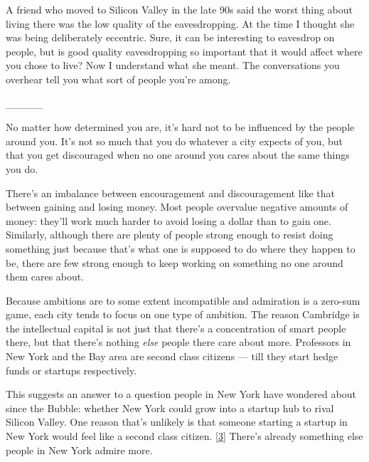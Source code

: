 A friend who
                  moved to Silicon Valley in the late 90s said the worst thing
                  about living there was the low quality of the eavesdropping.
                  At the time I thought she was being deliberately eccentric.
                  Sure, it can be interesting to eavesdrop on people, but is
                  good quality eavesdropping so important that it would affect
                  where you chose to live? Now I understand what she meant. The
                  conversations you overhear tell you what sort of people you're
                  among.


                  \_\_\_\_\_
                  

No matter how determined you are, it's hard not to
                  be influenced by the people around you. It's not so much that
                  you do whatever a city expects of you, but that you get
                  discouraged when no one around you cares about the same things
                  you do.

There's an imbalance between encouragement
                  and discouragement like that between gaining and losing money.
                  Most people overvalue negative amounts of money: they'll work
                  much harder to avoid losing a dollar than to gain one.
                  Similarly, although there are plenty of people strong enough
                  to resist doing something just because that's what one is
                  supposed to do where they happen to be, there are few strong
                  enough to keep working on something no one around them cares
                  about.

Because ambitions are to some extent
                  incompatible and admiration is a zero-sum game, each city
                  tends to focus on one type of ambition. The reason Cambridge
                  is the intellectual capital is not just that there's a
                  concentration of smart people there, but that there's nothing
                  \emph{else} people there care about more. Professors in New
                  York and the Bay area are second class citizens --- till
                  they start hedge funds or startups respectively.

This
                  suggests an answer to a question people in New York have
                  wondered about since the Bubble: whether New York could grow
                  into a startup hub to rival Silicon Valley. One reason that's
                  unlikely is that someone starting a startup in New York would
                  feel like a second class citizen.
                  [\href{\#f3n}{3}]
                  There's already something else people in New York admire
                  more.

